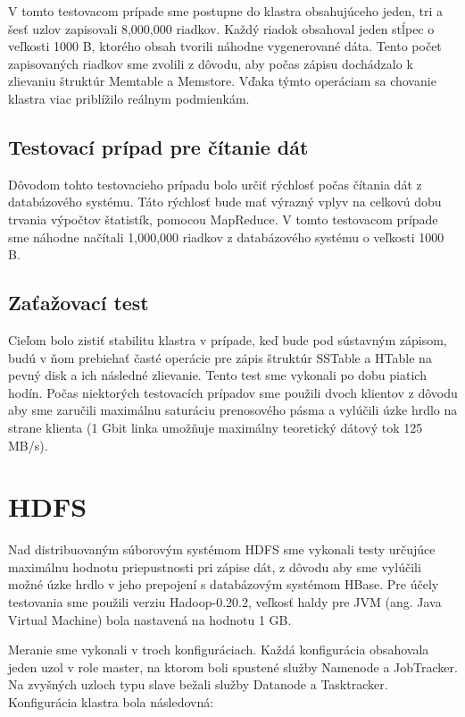 \documentclass[11pt,twoside,a4paper]{book}
\begin{document}
V tomto testovacom prípade sme postupne do klastra obsahujúceho jeden, tri a šesť uzlov zapisovali 8,000,000 riadkov. Každý riadok obsahoval jeden stĺpec o veľkosti 1000 B, ktorého obsah tvorili náhodne vygenerované dáta. Tento počet zapisovaných riadkov sme zvolili z dôvodu, aby počas zápisu dochádzalo k zlievaniu štruktúr Memtable a Memstore. Vďaka týmto operáciam sa chovanie klastra viac priblížilo reálnym podmienkám.

\subsection{Testovací prípad pre čítanie dát}

Dôvodom tohto testovacieho prípadu bolo určiť rýchlosť počas čítania dát z databázového systému. Táto rýchlosť bude mať výrazný vplyv na celkovú dobu trvania výpočtov štatistík, pomocou MapReduce. V tomto testovacom prípade sme náhodne načítali 1,000,000 riadkov z databázového systému o veľkosti 1000 B.

\subsection{Zaťažovací test}

Cieľom bolo zistiť stabilitu klastra v prípade, keď bude pod sústavným zápisom, budú v ňom prebiehať časté operácie pre zápis štruktúr SSTable a HTable na pevný disk a ich následné zlievanie. Tento test sme vykonali po dobu piatich hodín. Počas niektorých testovacích prípadov sme použili dvoch klientov z dôvodu aby sme zaručili maximálnu saturáciu prenosového pásma a vylúčili úzke hrdlo na strane klienta (1 Gbit linka umožňuje maximálny teoretický dátový tok 125 MB/s).


\section{HDFS}
Nad distribuovaným súborovým systémom HDFS sme vykonali testy určujúce maximálnu hodnotu priepustnosti pri zápise dát, z dôvodu aby sme vylúčili možné úzke hrdlo v jeho prepojení s databázovým systémom HBase. Pre účely testovania sme použili verziu Hadoop-0.20.2, veľkosť haldy pre JVM (ang. Java Virtual Machine) bola nastavená na hodnotu 1 GB.

Meranie sme vykonali v troch konfiguráciach. Každá konfigurácia obsahovala jeden uzol v role master, na ktorom boli spustené služby Namenode a JobTracker. Na zvyšných uzloch typu slave bežali služby Datanode a Tasktracker. Konfigurácia klastra bola následovná:
\end{document}
